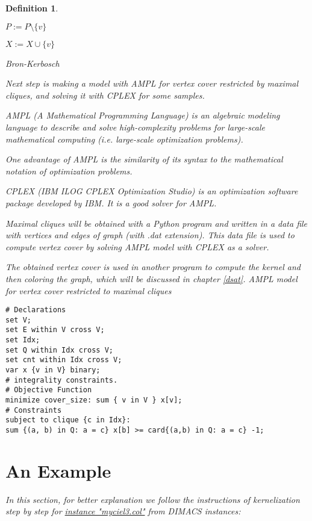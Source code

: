 \documentclass[12pt]{article}
\theoremstyle{slplain}
\newtheorem{defi}{Definition}
\begin{document}
\begin{defi}
\begin{algorithm}
\begin{algorithmic}
{{			    $P := P\setminus \{v\}$
			    
			   	   $X := X\cup \{v\}$\\
		}\EndFor
}\EndFunction
\end{algorithmic}
\caption{Bron-Kerbosch}
\end{algorithm}


\newpage


Next step is making a model with AMPL\cite{ampl} for vertex cover restricted by
maximal cliques, and solving it with CPLEX\cite{cplex} for some samples.

AMPL (A Mathematical Programming Language) is an algebraic modeling language to describe and solve high-complexity problems for large-scale mathematical computing (i.e. large-scale optimization problems). 

One advantage of AMPL is the similarity of its syntax to the mathematical notation of optimization problems.

CPLEX (IBM ILOG CPLEX Optimization Studio) is an optimization software package developed by IBM. It is a good solver for AMPL.

Maximal cliques will be obtained with a Python program and written in a data file 
with vertices and edges of graph (with .dat extension). This data file is used 
to compute vertex cover by solving AMPL model with CPLEX as a solver.

The obtained vertex cover is used in another program to compute the
kernel and then coloring the graph, which will be discussed in chapter \ref{dsat}.
\newpage
AMPL model for vertex cover restricted to maximal cliques

\hline

\begin{verbatim}
# Declarations
set V;
set E within V cross V;
set Idx;
set Q within Idx cross V;
set cnt within Idx cross V;
var x {v in V} binary;
# integrality constraints.
# Objective Function
minimize cover_size: sum { v in V } x[v];
# Constraints
subject to clique {c in Idx}:
sum {(a, b) in Q: a = c} x[b] >= card{(a,b) in Q: a = c} -1;
\end{verbatim}

\newpage


\section{An Example}{\label{section}}
In this section, for better explanation we follow the instructions of kernelization
step by step for \href{http://mat.gsia.cmu.edu/COLOR/instances/myciel3.col}{instance "myciel3.col"} from DIMACS instances\cite{instance}:


\end{defi}
\end{document}

